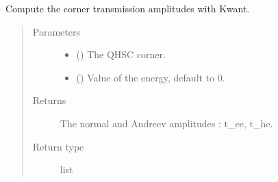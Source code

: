 \documentclass[letterpaper,10pt,english]{sphinxmanual}
\begin{document}
\begin{fulllineitems}
\label{\detokenize{modules:modules.utils.compute_corner_transmissions}}
\pysigstartsignatures
{}
\pysigstopsignatures
\sphinxAtStartPar
Compute the corner transmission amplitudes with Kwant.
\begin{quote}\begin{description}
\item[{Parameters}] \leavevmode\begin{itemize}
\item {} 
\sphinxAtStartPar
{} () \textendash{} The QH\sphinxhyphen{}SC corner.

\item {} 
\sphinxAtStartPar
{} () \textendash{} Value of the energy, default to 0.

\end{itemize}

\item[{Returns}] \leavevmode
\sphinxAtStartPar
The normal and Andreev amplitudes : t\_ee, t\_he.

\item[{Return type}] \leavevmode
\sphinxAtStartPar
list

\end{description}\end{quote}

\end{fulllineitems}

\end{document}
